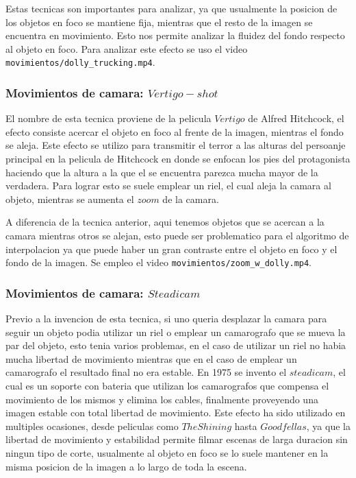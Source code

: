 Estas tecnicas son importantes para analizar, ya que usualmente la posicion de los objetos en foco se mantiene fija, mientras que el resto de la imagen se encuentra en movimiento. Esto nos permite analizar la fluidez del fondo respecto al objeto en foco. Para analizar este efecto se uso el video \texttt{movimientos/dolly\_trucking.mp4}.

\subsubsection{Movimientos de camara: $Vertigo-shot$}

El nombre de esta tecnica proviene de la pelicula $Vertigo$ de Alfred Hitchcock, el efecto consiste acercar el objeto en foco al frente de la imagen, mientras el fondo se aleja. Este efecto se utilizo para transmitir el terror a las alturas del persoanje principal en la pelicula de Hitchcock en donde se enfocan los pies del protagonista haciendo que la altura a la que el se encuentra parezca mucha mayor de la verdadera. Para lograr esto se suele emplear un riel, el cual aleja la camara al objeto, mientras se aumenta el $zoom$ de la camara.

A diferencia de la tecnica anterior, aqui tenemos objetos que se acercan a la camara mientras otros se alejan, esto puede ser problematico para el algoritmo de interpolacion ya que puede haber un gran contraste entre el objeto en foco y el fondo de la imagen. Se empleo el video \texttt{movimientos/zoom\_w\_dolly.mp4}.

\subsubsection{Movimientos de camara: $Steadicam$}

Previo a la invencion de esta tecnica, si uno queria desplazar la camara para seguir un objeto podia utilizar un riel o emplear un camarografo que se mueva la par del objeto, esto tenia varios problemas, en el caso de utilizar un riel no habia mucha libertad de movimiento mientras que en el caso de emplear un camarografo el resultado final no era estable. En 1975 se invento el $steadicam$, el cual es un soporte con bateria que utilizan los camarografos que compensa el movimiento de los mismos y elimina los cables, finalmente proveyendo una imagen estable con total libertad de movimiento. Este efecto ha sido utilizado en multiples ocasiones, desde peliculas como $The Shining$ hasta $Goodfellas$, ya que la libertad de movimiento y estabilidad permite filmar escenas de larga duracion sin ningun tipo de corte, usualmente al objeto en foco se lo suele mantener en la misma posicion de la imagen a lo largo de toda la escena.

